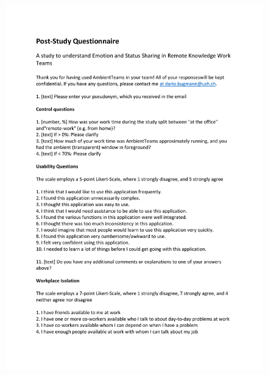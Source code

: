 \begin{figure}[h]
    \centering
    \includegraphics[width=\linewidth, page=1]{./documents/poststudy_Questionnaire.pdf}
\end{figure}

